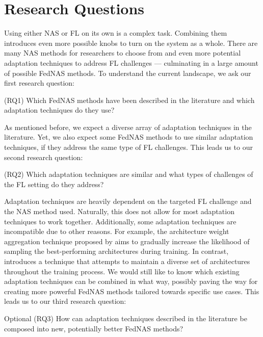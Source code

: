 \section{Research Questions}

Using either NAS or FL on its own is a complex task. Combining them introduces even more possible knobs to turn on the system as a whole. There are many NAS methods for researchers to choose from and even more potential adaptation techniques to address FL challenges — culminating in a large amount of possible FedNAS methods. To understand the current landscape, we ask our first research question:

\vspace{1em}
(RQ1) Which FedNAS methods have been described in the literature and which adaptation techniques do they use?
\vspace{1em}

As mentioned before, we expect a diverse array of adaptation techniques in the literature. Yet, we also expect some FedNAS methods to use similar adaptation techniques, if they address the same type of FL challenges. This leads us to our second research question:

\vspace{1em}
(RQ2) Which adaptation techniques are similar and what types of challenges of the FL setting do they address?
\vspace{1em}

Adaptation techniques are heavily dependent on the targeted FL challenge and the NAS method used. Naturally, this does not allow for most adaptation techniques to work together. Additionally, some adaptation techniques are incompatible due to other reasons. For example, the architecture weight aggregation technique proposed by \cite{efnas_2024} aims to gradually increase the likelihood of sampling the best-performing architectures during training. In contrast, \cite{superfednas_2024} introduces a technique that attempts to maintain a diverse set of architectures throughout the training process. We would still like to know which existing adaptation techniques can be combined in what way, possibly paving the way for creating more powerful FedNAS methods tailored towards specific use cases. This leads us to our third research question:

\vspace{1em}
Optional (RQ3) How can adaptation techniques described in the literature be composed into new, potentially better FedNAS methods?
\vspace{1em}


